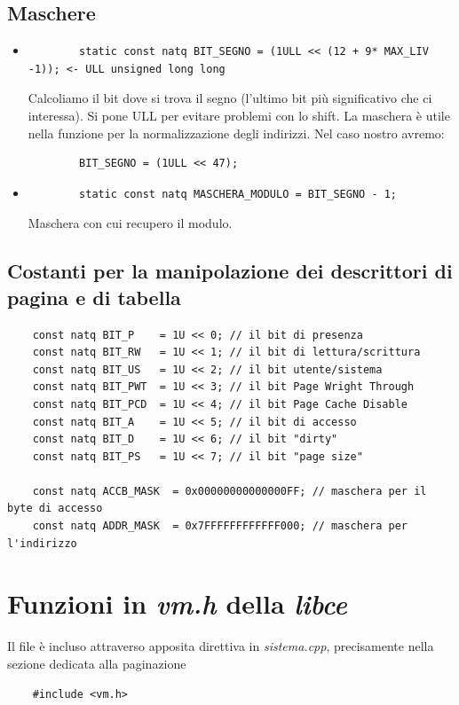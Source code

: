 \subsection{Maschere}
\begin{itemize}
	\item 
	\begin{verbatim}
		static const natq BIT_SEGNO = (1ULL << (12 + 9* MAX_LIV -1)); <- ULL unsigned long long
	\end{verbatim}
	Calcoliamo il bit dove si trova il segno (l'ultimo bit più significativo che ci interessa). Si pone ULL per evitare problemi con lo shift. La maschera è utile nella funzione per la normalizzazione degli indirizzi. Nel caso nostro avremo:
	\begin{verbatim}
		BIT_SEGNO = (1ULL << 47);
	\end{verbatim}
	\item \begin{verbatim} 
		static const natq MASCHERA_MODULO = BIT_SEGNO - 1;
	\end{verbatim} 
	Maschera con cui recupero il modulo.
\end{itemize}	
\subsection{Costanti per la manipolazione dei descrittori di pagina e di tabella}
\small
\begin{verbatim}
	const natq BIT_P    = 1U << 0; // il bit di presenza
	const natq BIT_RW   = 1U << 1; // il bit di lettura/scrittura
	const natq BIT_US   = 1U << 2; // il bit utente/sistema
	const natq BIT_PWT  = 1U << 3; // il bit Page Wright Through
	const natq BIT_PCD  = 1U << 4; // il bit Page Cache Disable
	const natq BIT_A    = 1U << 5; // il bit di accesso
	const natq BIT_D    = 1U << 6; // il bit "dirty"
	const natq BIT_PS   = 1U << 7; // il bit "page size"
	
	const natq ACCB_MASK  = 0x00000000000000FF; // maschera per il byte di accesso
	const natq ADDR_MASK  = 0x7FFFFFFFFFFFF000; // maschera per l'indirizzo
\end{verbatim}
\normalsize

\section{Funzioni in \emph{vm.h} della \emph{libce}}
Il file è incluso attraverso apposita direttiva in \emph{sistema.cpp}, precisamente nella sezione dedicata alla paginazione
\begin{verbatim}
	#include <vm.h>
\end{verbatim}
